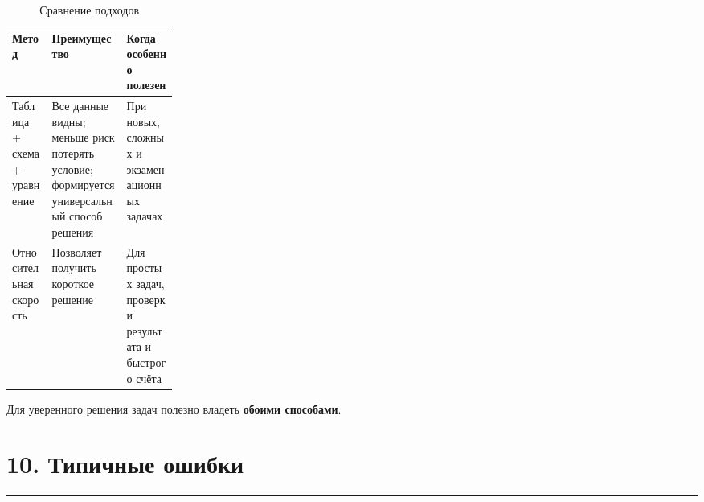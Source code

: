 \documentclass[a4paper,12pt]{article}
\newcommand{\sectionline}{
    \vspace{-0.2em}
    {\color{linegray}\rule{\linewidth}{0.5pt}}
    \vspace{0.5em}
}
\newcommand{\key}[1]{\textcolor{darkaccent}{\textbf{#1}}}
\begin{document}
\begin{table}[h!]
\centering
\caption{Сравнение подходов}
\renewcommand{\arraystretch}{1.35}
\begin{tabularx}{\linewidth}{p{0.24\linewidth}XX}
\toprule
\textbf{Метод} & \textbf{Преимущество} & \textbf{Когда особенно полезен}\\
\midrule
Таблица + схема + уравнение
&
Все данные видны; меньше риск потерять условие; формируется универсальный способ решения
&
При новых, сложных и экзаменационных задачах
\\
\addlinespace
Относительная скорость
&
Позволяет получить короткое решение
&
Для простых задач, проверки результата и быстрого счёта
\\
\bottomrule
\end{tabularx}
\end{table}

Для уверенного решения задач полезно владеть \key{обоими способами}.


\section*{\textcolor{darkaccent}{10. Типичные ошибки}}

\sectionline
\end{document}
